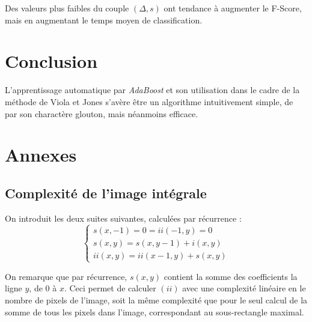 \documentclass[12pt,a4paper]{article}
\begin{document}
Des valeurs plus faibles du couple $(\Delta, s)$ ont tendance à augmenter le F-Score, mais en augmentant le temps moyen de classification.

\section{Conclusion}
L'apprentissage automatique par \textit{AdaBoost} et son utilisation dans le cadre de la méthode de Viola et Jones s'avère être un algorithme intuitivement simple, de par son charactère glouton, mais néanmoins efficace.

\newpage

\section{Annexes}
\subsection{Complexité de l'image intégrale}
On introduit les deux suites suivantes, calculées par récurrence :
\begin{equation}
    \begin{cases}
        s(x, -1) = 0 = ii(-1, y) = 0 \\
        s(x, y) = s(x, y-1) + i(x, y) \\
        ii(x, y) = ii(x-1, y) + s(x, y)
    \end{cases}
\end{equation}

On remarque que par récurrence, $s(x, y)$ contient la somme des coefficients la ligne $y$, de $0$ à $x$. Ceci permet de calculer $(ii)$ avec une complexité linéaire en le nombre de pixels de l'image, soit la même complexité que pour le seul calcul de la somme de tous les pixels dans l'image, correspondant au sous-rectangle maximal.
\end{document}
